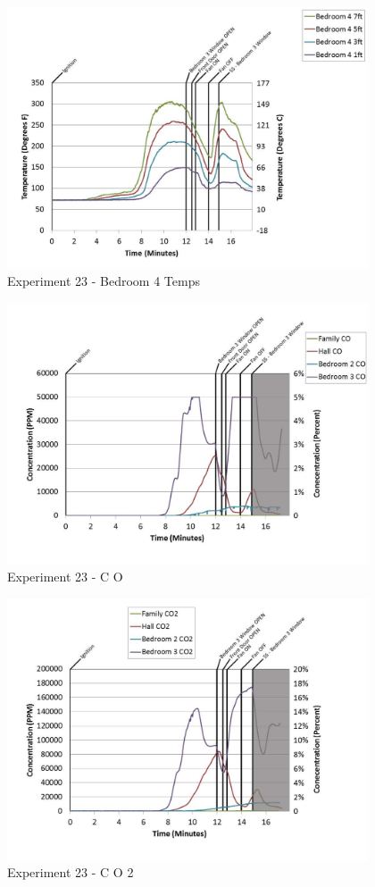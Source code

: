 \documentclass{article}
\begin{document}
\begin{appendices}
	\clearpage

	\begin{figure}[h!]
		\centering
		\includegraphics[height=3.05in]{0_Images/Results_Charts/Exp_23_Charts/Bedroom4Temps.pdf}
		\caption{Experiment 23 - Bedroom 4 Temps}
	\end{figure}
 

	\begin{figure}[h!]
		\centering
		\includegraphics[height=3.05in]{0_Images/Results_Charts/Exp_23_Charts/CO.pdf}
		\caption{Experiment 23 - C O}
	\end{figure}
 
	\clearpage

	\begin{figure}[h!]
		\centering
		\includegraphics[height=3.05in]{0_Images/Results_Charts/Exp_23_Charts/CO2.pdf}
		\caption{Experiment 23 - C O 2}
	\end{figure}
 


\end{appendices}
\end{document}
